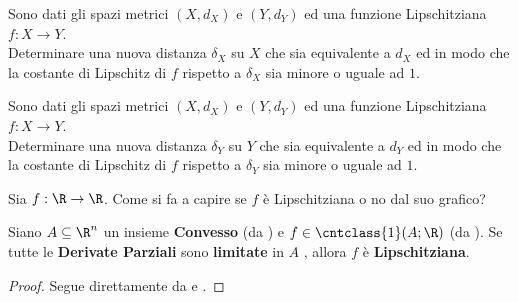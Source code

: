 \begin{example}
	Sono dati gli spazi metrici $(X,d_X)$ e $(Y,d_Y)$ ed una funzione Lipschitziana $f: X \to Y$.\\
	Determinare una nuova distanza $\delta_X$ su $X$ che sia equivalente a $d_X$ ed in modo che la costante di Lipschitz di $f$ rispetto a $\delta_X$ sia minore o uguale ad $1$.
\end{example}
\begin{example}
	Sono dati gli spazi metrici $(X,d_X)$ e $(Y,d_Y)$ ed una funzione Lipschitziana $f: X \to Y$.\\
	Determinare una nuova distanza $\delta_Y$ su $Y$ che sia equivalente a $d_Y$ ed in modo che la costante di Lipschitz di $f$ rispetto a $\delta_Y$ sia minore o uguale ad $1$.
\end{example}
\begin{exercise}
	Sia $f: \R \to \R$. Come si fa a capire se $f$ è Lipschitziana o no dal suo grafico?
\end{exercise}

\begin{proposition}
	\label{prop:convesso_deriv_par_lim_allora_lips}
	Siano $A \subseteq \R^n$ un insieme \textbf{Convesso} (da ) e $f \in \cntclass{1}(A;\R)$ (da ). Se tutte le \textbf{Derivate Parziali} sono \textbf{limitate} in $A$ , allora $f$ è \textbf{Lipschitziana}.
	\begin{proof}
		Segue direttamente da  e .
	\end{proof}
\end{proposition}

